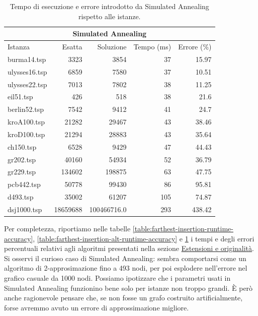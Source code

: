 \begin{table}[h!]
    \centering

    \begin{tabular}{lrrrr}
    \toprule
    \multicolumn{5}{c}{Simulated Annealing} \\
    \hline
     Istanza       &   Esatta &        Soluzione &   Tempo (ms) &   Errore (\%) \\
    \hline
 burma14.tsp   &     3323 &   3854         &           37 &        15.97 \\
 ulysses16.tsp &     6859 &   7580           &           37 &        10.51 \\
 ulysses22.tsp &     7013 &   7802           &           38 &        11.25 \\
 eil51.tsp     &      426 &    518           &           38 &        21.6  \\
 berlin52.tsp  &     7542 &   9412         &           41 &        24.7  \\
 kroA100.tsp   &    21282 &  29467           &           43 &        38.46 \\
 kroD100.tsp   &    21294 &  28883         &           43 &        35.64 \\
 ch150.tsp     &     6528 &   9429         &           47 &        44.43 \\
 gr202.tsp     &    40160 &  54934           &           52 &        36.79 \\
 gr229.tsp     &   134602 & 198875           &           63 &        47.75 \\
 pcb442.tsp    &    50778 &  99430           &           86 &        95.81 \\
 d493.tsp      &    35002 &  61207           &          105 &        74.87 \\
 dsj1000.tsp   & 18659688 &   100466716.0 &          293 &       438.42 \\
    \bottomrule
    \end{tabular}
    \caption{Tempo di esecuzione e errore introdotto da Simulated Annealing rispetto alle istanze.}
    \label{table:simulated-annealing-runtime-accuracy}
\end{table}

Per completezza, riportiamo nelle tabelle \ref{table:farthest-insertion-runtime-accuracy}, \ref{table:farthest-insertion-alt-runtime-accuracy} e \ref{table:simulated-annealing-runtime-accuracy} i tempi e degli errori percentuali relativi agli algoritmi presentati nella sezione \hyperref[cap:extensions-and-originalities]{Estensioni e originalità}. \\

\noindent Si osservi il curioso caso di Simulated Annealing: sembra comportarsi come un algoritmo di 2-approsimazione fino a 493 nodi, per poi esplodere nell'errore nel grafico casuale da 1000 nodi. Possiamo ipotizzare che i parametri usati in Simulated Annealing funzionino bene solo per istanze non troppo grandi. È però anche ragionevole pensare che, se  non fosse un grafo costruito artificialmente, forse avremmo avuto un errore di approssimazione migliore.
